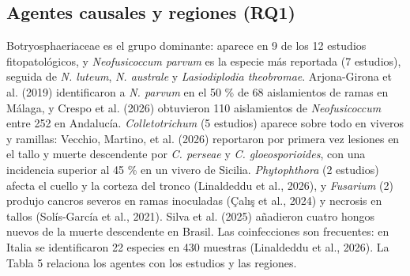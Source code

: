 \documentclass[11pt]{article}
\begin{document}
\subsection{Agentes causales y regiones (RQ1)}

Botryosphaeriaceae es el grupo dominante: aparece en 9 de los 12 estudios fitopatológicos, y \textit{Neofusicoccum parvum} es la especie más reportada (7 estudios), seguida de \textit{N. luteum}, \textit{N. australe} y \textit{Lasiodiplodia theobromae}. Arjona-Girona et al. (2019) identificaron a \textit{N. parvum} en el 50 \% de 68 aislamientos de ramas en Málaga, y Crespo et al. (2026) obtuvieron 110 aislamientos de \textit{Neofusicoccum} entre 252 en Andalucía. \textit{Colletotrichum} (5 estudios) aparece sobre todo en viveros y ramillas: Vecchio, Martino, et al. (2026) reportaron por primera vez lesiones en el tallo y muerte descendente por \textit{C. perseae} y \textit{C. gloeosporioides}, con una incidencia superior al 45 \% en un vivero de Sicilia. \textit{Phytophthora} (2 estudios) afecta el cuello y la corteza del tronco (Linaldeddu et al., 2026), y \textit{Fusarium} (2) produjo cancros severos en ramas inoculadas (Çalış et al., 2024) y necrosis en tallos (Solís-García et al., 2021). Silva et al. (2025) añadieron cuatro hongos nuevos de la muerte descendente en Brasil. Las coinfecciones son frecuentes: en Italia se identificaron 22 especies en 430 muestras (Linaldeddu et al., 2026). La Tabla 5 relaciona los agentes con los estudios y las regiones.
\end{document}
